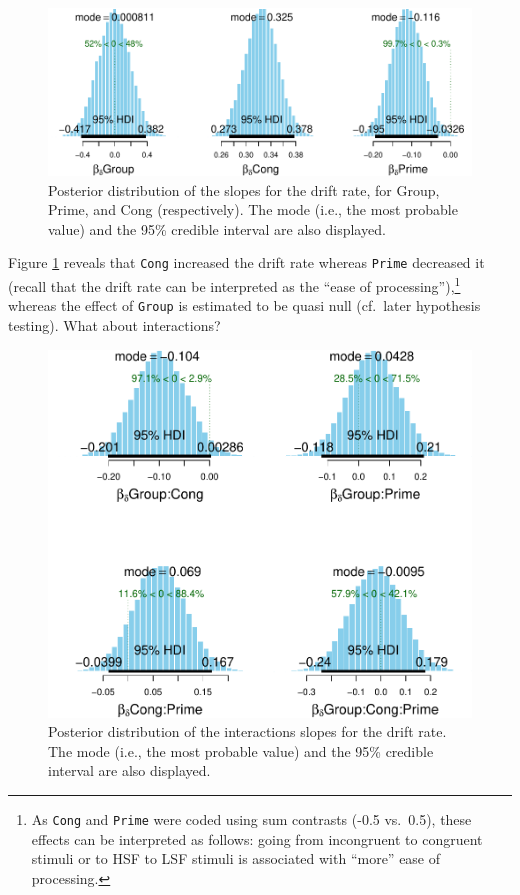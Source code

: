 \documentclass[
  11pt,
  english,
  ,doc,floatsintext]{apa6}
\begin{document}
\begin{figure}[!htb]

{\centering \includegraphics[width=1\linewidth]{supplementary_materials_files/figure-latex/posterior-slopes-drift-1} 

}

\caption{Posterior distribution of the slopes for the drift rate, for Group, Prime, and Cong (respectively). The mode (i.e., the most probable value) and the 95\% credible interval are also displayed.}\label{fig:posterior-slopes-drift}
\end{figure}

Figure \ref{fig:posterior-slopes-drift} reveals that \texttt{Cong} increased the drift rate whereas \texttt{Prime} decreased it (recall that the drift rate can be interpreted as the \enquote{ease of processing}),\footnote{As \texttt{Cong} and \texttt{Prime} were coded using sum contrasts (-0.5 vs.~0.5), these effects can be interpreted as follows: going from incongruent to congruent stimuli or to HSF to LSF stimuli is associated with \enquote{more} ease of processing.} whereas the effect of \texttt{Group} is estimated to be quasi null (cf.~later hypothesis testing). What about interactions?

\begin{figure}[!htb]

{\centering \includegraphics[width=0.75\linewidth]{supplementary_materials_files/figure-latex/posterior-interactions-drift-1} 

}

\caption{Posterior distribution of the interactions slopes for the drift rate. The mode (i.e., the most probable value) and the 95\% credible interval are also displayed.}\label{fig:posterior-interactions-drift}
\end{figure}
\end{document}
